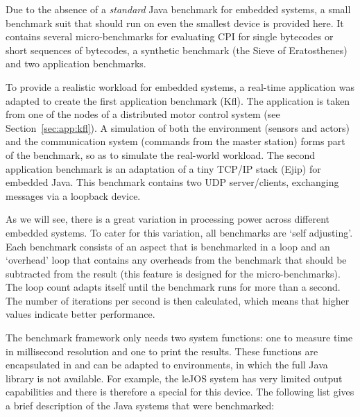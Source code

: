 Due to the absence of a \emph{standard} Java benchmark for embedded
systems, a small benchmark suit that should run on even the smallest
device is provided here. It contains several micro-benchmarks for
evaluating CPI for single bytecodes or short sequences of bytecodes,
a synthetic benchmark (the Sieve of Eratosthenes) and two
application benchmarks.

To provide a realistic workload for embedded systems, a real-time
application was adapted to create the first application benchmark
(Kfl). The application is taken from one of the nodes of a
distributed motor control system \cite{jop:wises03} (see
Section~\ref{sec:app:kfl}). A simulation of both the environment
(sensors and actors) and the communication system (commands from the
master station) forms part of the benchmark, so as to simulate the
real-world workload. The second application benchmark is an
adaptation of a tiny TCP/IP stack (Ejip) for embedded Java. This
benchmark contains two UDP server/clients, exchanging messages via a
loopback device.

As we will see, there is a great variation in processing power
across different embedded systems. To cater for this variation, all
benchmarks are `self adjusting'. Each benchmark consists of an
aspect that is benchmarked in a loop and an `overhead' loop that
contains any overheads from the benchmark that should be subtracted
from the result (this feature is designed for the micro-benchmarks).
The loop count adapts itself until the benchmark runs for more than
a second. The number of iterations per second is then calculated,
which means that higher values indicate better performance.

The benchmark framework only needs two system functions: one to
measure time in millisecond resolution and one to print the results.
These functions are encapsulated in  and can be
adapted to environments, in which the full Java library is not
available. For example, the leJOS system has very limited output
capabilities and there is therefore a special 
for this device. The following list gives a brief description of the
Java systems that were benchmarked:

